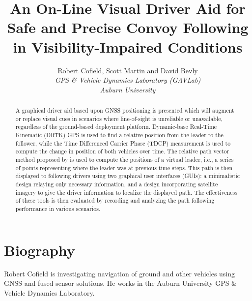 \documentclass[twocolumn,10pt]{article}
\begin{document}

\title{\textbf{An On-Line Visual Driver Aid for Safe and Precise Convoy Following in Visibility-Impaired Conditions}}
\author{
  Robert Cofield, Scott Martin and David Bevly \\
  \em{GPS \& Vehicle Dynamics Laboratory (GAVLab)} \\
  \em{Auburn University} \\
}
\date{} %
\maketitle


\begin{abstract}

  A graphical driver aid based upon GNSS positioning is presented which will augment or replace visual cues in scenarios where line-of-sight is unreliable or unavailable, regardless of the ground-based deployment platform.
  Dynamic-base Real-Time Kinematic (DRTK) GPS is used to find a relative position from the leader to the follower, while the Time Differenced Carrier Phase (TDCP) measurement is used to compute the change in position of both vehicles over time.
  The relative path vector method proposed by \cite{travisdiss} is used to compute the positions of a virtual leader, i.e., a series of points representing where the leader was at previous time steps.
  This path is then displayed to following drivers using two graphical user interfaces (GUIs): a minimalistic design relaying only necessary information, and a design incorporating satellite imagery to give the driver information to localize the displayed path.
  The effectiveness of these tools is then evaluated by recording and analyzing the path following performance in various scenarios.

\end{abstract}


\section*{Biography}

  Robert Cofield is investigating navigation of ground and other vehicles using GNSS and fused sensor solutions.  He works in the Auburn University GPS \& Vehicle Dynamics Laboratory.
\end{document}
